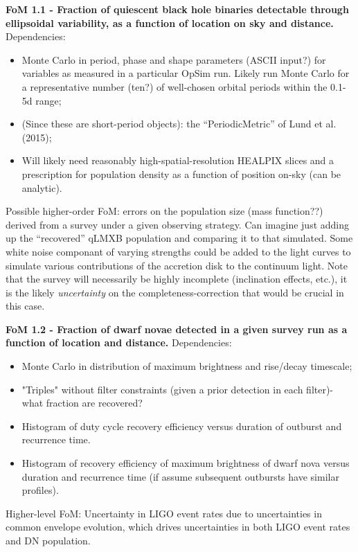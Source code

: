 {\bf FoM 1.1 - Fraction of quiescent
  black hole binaries detectable through ellipsoidal variability, as a function of location on sky and distance.}
Dependencies:
\begin{itemize}
  \item Monte Carlo in period, phase and shape parameters (ASCII input?) for variables as measured in a particular OpSim run. Likely run Monte Carlo for a representative number (ten?) of well-chosen orbital periods within the 0.1-5d range;
  \item (Since these are short-period objects): the ``PeriodicMetric'' of Lund et al. (2015);
  \item Will likely need reasonably high-spatial-resolution HEALPIX slices and a prescription for population density as a function of position on-sky (can be analytic).
\end{itemize}
Possible higher-order FoM: errors on the population size (mass
function??) derived from a survey under a given observing
strategy. Can imagine just adding up the ``recovered'' qLMXB
population and comparing it to that simulated. Some white noise componant of varying strengths could be
added to the light curves to simulate various contributions of the accretion disk to the continuum light. 
Note that the survey will necessarily be highly incomplete (inclination effects, etc.), it
is the likely {\it uncertainty} on the completeness-correction that
would be crucial in this case. 

{\bf FoM 1.2 - Fraction of dwarf novae detected in a given survey
  run as a function of location and distance.}
Dependencies:
\begin{itemize}
  \item Monte Carlo in distribution of maximum brightness and rise/decay timescale;
    \item "Triples" without filter constraints (given a prior detection in each filter)- what fraction are recovered?
    \item Histogram of duty cycle recovery efficiency versus duration of outburst and recurrence time.
    \item Histogram of recovery efficiency of maximum brightness of dwarf nova versus duration and recurrence time (if assume subsequent outbursts have similar profiles).
    \end{itemize}
Higher-level FoM: Uncertainty in LIGO event rates due to
uncertainties in common envelope evolution, which drives uncertainties in both LIGO event rates and DN population.

